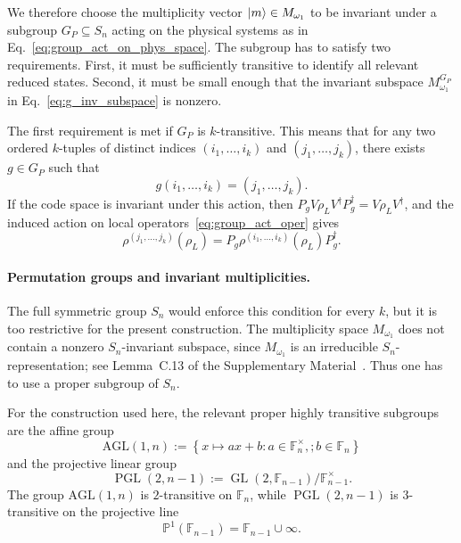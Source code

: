 \documentclass[10pt,twocolumn,superscriptaddress,aps,amsmath,amssymb,citeautoscript,floatfix,prx,longbibliography]{revtex4-2}
\theoremstyle{plain}
\theoremstyle{plain}
\theoremstyle{plain}
\theoremstyle{plain}
\theoremstyle{plain}
\theoremstyle{plain}
\begin{document}
We therefore choose the multiplicity vector $\ket m\in M_{\omega_1}$ to be invariant under a subgroup $G_P\subseteq S_n$ acting on the physical systems as in Eq.~\eqref{eq:group_act_on_phys_space}. The subgroup has to satisfy two requirements. First, it must be sufficiently transitive to identify all relevant reduced states. Second, it must be small enough that the invariant subspace $M_{\omega_1}^{G_P}$ in Eq.~\eqref{eq:g_inv_subspace} is nonzero.

The first requirement is met if $G_P$ is $k$-transitive. This means that for any two ordered $k$-tuples of distinct indices $(i_1,\ldots,i_k)$ and $(j_1,\ldots,j_k)$, there exists $g\in G_P$ such that
$$
g(i_1,\ldots,i_k)=(j_1,\ldots,j_k).
$$
If the code space is invariant under this action, then $P_gV\rho_LV^\dagger P_g^\dagger=V\rho_LV^\dagger$, and the induced action on local operators~\eqref{eq:group_act_oper} gives
$$
\rho^{(j_1,\ldots,j_k)}(\rho_L)
=
P_g
\rho^{(i_1,\ldots,i_k)}(\rho_L)
P_g^\dagger .
$$

\paragraph{Permutation groups and invariant multiplicities.}

The full symmetric group $S_n$ would enforce this condition for every $k$, but it is too restrictive for the present construction. The multiplicity space $M_{\omega_1}$ does not contain a nonzero $S_n$-invariant subspace, since $M_{\omega_1}$ is an irreducible $S_n$-representation; see Lemma~C.13 of the Supplementary Material~\cite{SuppMat}. Thus one has to use a proper subgroup of $S_n$.

For the construction used here, the relevant proper highly transitive subgroups are the affine group
\begin{equation}\label{eq:AGL_def}
\mathrm{AGL}(1,n)
:=
\left\{
x\mapsto ax+b:
a\in\mathbb F_n^\times,;
b\in\mathbb F_n
\right\}
\end{equation}
and the projective linear group
\begin{equation}\label{eq:PGL_def}
\operatorname{PGL}(2,n-1)
:=
\operatorname{GL}\left(2,\mathbb F_{n-1}\right)
/\mathbb F_{n-1}^\times .
\end{equation}
The group $\mathrm{AGL}(1,n)$ is $2$-transitive on $\mathbb F_n$, while $\operatorname{PGL}(2,n-1)$ is $3$-transitive on the projective line
$$
\mathbb P^1(\mathbb F_{n-1})
=
\mathbb F_{n-1}\cup{\infty}.
$$
\end{document}
